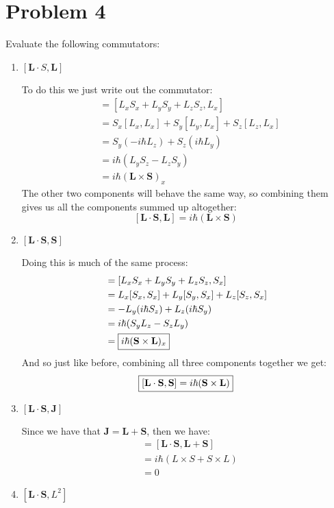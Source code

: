 \documentclass[10pt]{article}
\begin{document}
	\section*{Problem 4} 
	Evaluate the following commutators: 
	\begin{enumerate}[label=\alph*)]
			\item $[\mathbf L \cdot S, \mathbf L]$

			\begin{solution}
					To do this we just write out the commutator:
				\begin{align*}
					[\mathbf{L}\cdot\mathbf{S},L_x] &= [L_xS_x + L_yS_y + L_zS_z, L_x] \\
					&= S_x[L_x,L_x] + S_y[L_y,L_x] + S_z[L_z,L_x]\\
					&= S_y(-i\hbar L_z) + S_z(i\hbar L_y) \\
					&= i\hbar(L_yS_z - L_zS_y) \\
					&= i\hbar(\mathbf{L}\times\mathbf{S})_x
				\end{align*}
                The other two components will behave the same way, so combining them gives us all the components summed up altogether:
                \[[\mathbf{L}\cdot\mathbf{S}, \mathbf{L}] = i\hbar(\mathbf{L}\times\mathbf{S})\]			
			\end{solution}
			\item $[\mathbf {L \cdot S}, \mathbf S]$
			
			\begin{solution}
				Doing this is much of the same process:
                \begin{align*}
                    [\mathbf{L}\cdot\mathbf{S},S_x] &= [L_xS_x + L_yS_y + L_zS_z, S_x] \\
					&= L_x[S_x,S_x] + L_y[S_y,S_x] + L_z[S_z,S_x]\\
					&= -L_y(i\hbar S_z) + L_z(i\hbar S_y) \\
					&= i\hbar(S_yL_z - S_zL_y) \\
					&= \fbox{$i\hbar(\mathbf{S}\times\mathbf{L})_x$}
                \end{align*}
				And so just like before, combining all three components together we get:
                $$\fbox{$[\mathbf{L}\cdot\mathbf{S}, \mathbf{S}] = i\hbar(\mathbf{S}\times\mathbf{L})$}$$
			\end{solution}
			\item $[\mathbf{L \cdot S}, \mathbf J]$
			
			\begin{solution}
				Since we have that $\mathbf J = \mathbf{L + S}$, then we have: 
				\begin{align*}
					[\mathbf{L \cdot S}, \mathbf J] &= [\mathbf{L \cdot S}, \mathbf{L + S}]\\
					&= i\hbar (L \times S + S \times L)\\
					&= 0
				\end{align*}
			\end{solution}
			\item $[\mathbf{L \cdot S}, L^2]$
			

\end{enumerate}
\end{document}
